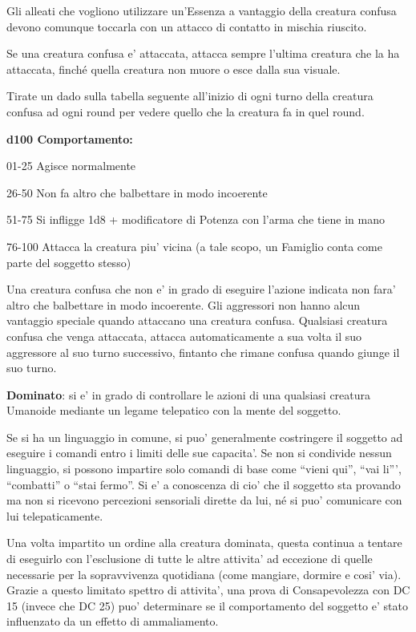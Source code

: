 \documentclass[a4paper,11pt,twoside,openany]{dndbook}
\begin{document}
{Gli alleati che vogliono utilizzare un'Essenza a vantaggio della creatura confusa devono comunque toccarla con un attacco di contatto in mischia riuscito.

Se una creatura confusa e' attaccata, attacca sempre l'ultima creatura che la ha attaccata, finché quella creatura non muore o esce dalla sua visuale.

Tirate un dado sulla tabella seguente all'inizio di ogni turno della
creatura confusa ad ogni round per vedere quello che la creatura fa
in quel round.

\textbf{d100 Comportamento:}

01-25 Agisce normalmente

26-50 Non fa altro che balbettare in modo incoerente

51-75 Si infligge 1d8 + modificatore di Potenza con l'arma che tiene in mano

76-100 Attacca la creatura piu' vicina (a tale scopo, un Famiglio conta come parte del soggetto stesso)

Una creatura confusa che non e' in grado di eseguire l'azione indicata non fara' altro che balbettare in modo incoerente. Gli aggressori non hanno alcun vantaggio speciale quando attaccano una creatura confusa. Qualsiasi creatura confusa che venga attaccata, attacca automaticamente a sua volta il suo aggressore al suo turno successivo, fintanto che rimane confusa quando giunge il suo turno.

\textbf{Dominato}: si e' in grado di controllare le azioni di una qualsiasi creatura Umanoide mediante un legame telepatico con la mente del soggetto.

Se si ha un linguaggio in comune, si puo' generalmente costringere il soggetto ad eseguire i comandi entro i limiti delle sue capacita'. Se non si condivide nessun linguaggio, si possono impartire solo comandi di base come ``vieni qui'', ``vai li''', ``combatti'' o ``stai fermo''. Si e' a conoscenza di cio' che il soggetto sta provando ma non si ricevono percezioni sensoriali dirette da lui, né si puo' comunicare con lui telepaticamente.

Una volta impartito un ordine alla creatura dominata, questa continua a tentare di eseguirlo con l'esclusione di tutte le altre attivita' ad eccezione di quelle necessarie per la sopravvivenza quotidiana (come mangiare, dormire e cosi' via). Grazie a questo limitato spettro di attivita', una prova di Consapevolezza con DC 15 (invece che DC 25) puo' determinare se il comportamento del soggetto e' stato influenzato da un effetto di ammaliamento.

}
\end{document}
